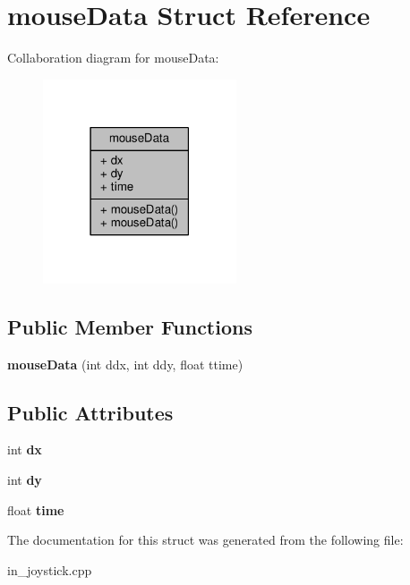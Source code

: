 \hypertarget{structmouseData}{}\section{mouse\+Data Struct Reference}
\label{structmouseData}


Collaboration diagram for mouse\+Data\+:
\nopagebreak
\begin{figure}[H]
\begin{center}
\leavevmode
\includegraphics[width=162pt]{dd/d9a/structmouseData__coll__graph}
\end{center}
\end{figure}
\subsection*{Public Member Functions}
\begin{DoxyCompactItemize}
\item 
{\bfseries mouse\+Data} (int ddx, int ddy, float ttime)\hypertarget{structmouseData_ab39c6f959deb4b0acf101a148414b6e8}{}\label{structmouseData_ab39c6f959deb4b0acf101a148414b6e8}

\end{DoxyCompactItemize}
\subsection*{Public Attributes}
\begin{DoxyCompactItemize}
\item 
int {\bfseries dx}\hypertarget{structmouseData_aa274a92c785b7d9f967fb9ade0f9c6b9}{}\label{structmouseData_aa274a92c785b7d9f967fb9ade0f9c6b9}

\item 
int {\bfseries dy}\hypertarget{structmouseData_a292b8190959655e93dd8353da131e9ef}{}\label{structmouseData_a292b8190959655e93dd8353da131e9ef}

\item 
float {\bfseries time}\hypertarget{structmouseData_af2bff9e6fd669e9390188a2972b82b7f}{}\label{structmouseData_af2bff9e6fd669e9390188a2972b82b7f}

\end{DoxyCompactItemize}


The documentation for this struct was generated from the following file\+:\begin{DoxyCompactItemize}
\item 
in\+\_\+joystick.\+cpp\end{DoxyCompactItemize}
